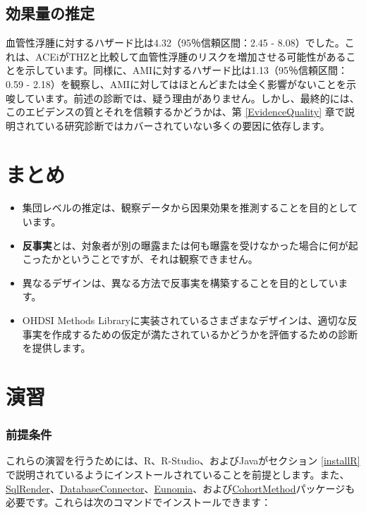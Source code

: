 \documentclass[
  11pt]{book}
\makeatletter
\newenvironment{kframe}{%
\medskip{}
\setlength{\fboxsep}{.8em}
 \def\at@end@of@kframe{}%
 \ifinner\ifhmode%
  \def\at@end@of@kframe{\end{minipage}}%
  \begin{minipage}{\columnwidth}%
 \fi\fi%
 \def\FrameCommand##1{\hskip\@totalleftmargin \hskip-\fboxsep
 \colorbox{myShadeColor}{##1}\hskip-\fboxsep
     \hskip-\linewidth \hskip-\@totalleftmargin \hskip\columnwidth}%
 \MakeFramed {\advance\hsize-\width
   \@totalleftmargin\z@ \linewidth\hsize
   \@setminipage}}%
 {\par\unskip\endMakeFramed%
 \at@end@of@kframe}
\newenvironment{rmdblock}[1]
  {
  \begin{itemize}
  \renewcommand{\labelitemi}{
    \raisebox{-.7\height}[0pt][0pt]{
      {\setkeys{Gin}{width=3em,keepaspectratio}\texttt{[image: images/\#1]}}
    }
  }
  \setlength{\fboxsep}{1em}
  \begin{kframe}
  \item
  }
  {
  \end{kframe}
  \end{itemize}
  }
\newenvironment{rmdsummary}
  {\begin{rmdblock}{summary}}
  {\end{rmdblock}}
\theoremstyle{definition}
\theoremstyle{definition}
\theoremstyle{definition}
\theoremstyle{definition}
\theoremstyle{remark}
\makeatother
\begin{document}
\subsection{効果量の推定}\label{ux52b9ux679cux91cfux306eux63a8ux5b9a}

血管性浮腫に対するハザード比は4.32（95％信頼区間：2.45 - 8.08）でした。これは、ACEiがTHZと比較して血管性浮腫のリスクを増加させる可能性があることを示しています。同様に、AMIに対するハザード比は1.13（95％信頼区間：0.59 - 2.18）を観察し、AMIに対してはほとんどまたは全く影響がないことを示唆しています。前述の診断では、疑う理由がありません。しかし、最終的には、このエビデンスの質とそれを信頼するかどうかは、第 \ref{EvidenceQuality} 章で説明されている研究診断ではカバーされていない多くの要因に依存します。

\section{まとめ}\label{ux307eux3068ux3081-9}

\begin{rmdsummary}
\begin{itemize}
\item
  集団レベルの推定は、観察データから因果効果を推測することを目的としています。
\item
  \textbf{反事実}とは、対象者が別の曝露または何も曝露を受けなかった場合に何が起こったかということですが、それは観察できません。
\item
  異なるデザインは、異なる方法で反事実を構築することを目的としています。
\item
  OHDSI Methods Libraryに実装されているさまざまなデザインは、適切な反事実を作成するための仮定が満たされているかどうかを評価するための診断を提供します。
\end{itemize}
\end{rmdsummary}

\section{演習}\label{ux6f14ux7fd2-7}

\subsubsection*{前提条件}\label{ux524dux63d0ux6761ux4ef6-7}

これらの演習を行うためには、R、R-Studio、およびJavaがセクション \ref{installR} で説明されているようにインストールされていることを前提とします。また、\href{https://ohdsi.github.io/SqlRender/}{SqlRender}、\href{https://ohdsi.github.io/DatabaseConnector/}{DatabaseConnector}、\href{https://ohdsi.github.io/Eunomia/}{Eunomia}、および\href{https://ohdsi.github.io/CohortMethod/}{CohortMethod}パッケージも必要です。これらは次のコマンドでインストールできます：
\end{document}
